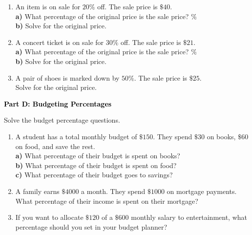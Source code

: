 \documentclass[12pt, letterpaper, fleqn]{article}
\newcommand{\blank}{\underline{\hspace{2.2cm}}}
\newcommand{\blanklong}{\underline{\hspace{6.5cm}}}
\begin{document}
\begin{enumerate}[itemsep=2.5cm, leftmargin=0.6cm]
\item An item is on sale for $20\%$ off. The sale price is $\$40$. \\
\textbf{a)} What percentage of the original price is the sale price? \blank \% \\
\textbf{b)} Solve for the original price. \\
\blanklong

\item A concert ticket is on sale for $30\%$ off. The sale price is $\$21$. \\
\textbf{a)} What percentage of the original price is the sale price? \blank \% \\
\textbf{b)} Solve for the original price. \\
\blanklong

\item A pair of shoes is marked down by $50\%$. The sale price is $\$25$. \\
Solve for the original price. \\
\blanklong
\end{enumerate}

\newpage

\begin{tcolorbox}[colback=black!10]
    \large\textcolor{black}{\textbf{Part D: Budgeting Percentages}}
\end{tcolorbox}

\vspace{3mm}

\noindent
Solve the budget percentage questions.

\vspace{5mm}

\begin{enumerate}[itemsep=2.5cm, leftmargin=0.6cm]
\item A student has a total monthly budget of $\$150$. They spend $\$30$ on books, $\$60$ on food, and save the rest. \\
\textbf{a)} What percentage of their budget is spent on books? \blanklong \\
\textbf{b)} What percentage of their budget is spent on food? \blanklong \\
\textbf{c)} What percentage of their budget goes to savings? \blanklong

\item A family earns $\$4000$ a month. They spend $\$1000$ on mortgage payments. What percentage of their income is spent on their mortgage?
\vspace{1cm}

\item If you want to allocate $\$120$ of a $\$600$ monthly salary to entertainment, what percentage should you set in your budget planner?
\end{enumerate}
\end{document}
